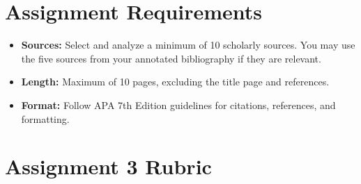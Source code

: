 \documentclass[
  letterpaper,
  DIV=11,
  numbers=noendperiod]{scrreprt}
\providecommand{\tightlist}{%
  \setlength{\itemsep}{0pt}\setlength{\parskip}{0pt}}\usepackage{longtable,booktabs,array}
\begin{document}
\section{Assignment Requirements}\label{assignment-requirements}

\begin{itemize}
\tightlist
\item
  \textbf{Sources:} Select and analyze a minimum of 10 scholarly
  sources. You may use the five sources from your annotated bibliography
  if they are relevant.
\item
  \textbf{Length:} Maximum of 10 pages, excluding the title page and
  references.
\item
  \textbf{Format:} Follow APA 7th Edition guidelines for citations,
  references, and formatting.
\end{itemize}

\section{Assignment 3 Rubric}\label{assignment-3-rubric}
\end{document}
